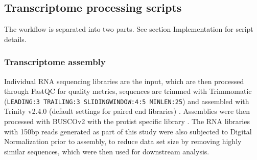 \documentclass[fleqn,10pt,lineno]{wlpeerj} %
\begin{document}
\subsection*{Transcriptome processing scripts}
The workflow is separated into two parts. 
See section Implementation for script details.
\subsubsection*{Transcriptome assembly}
Individual RNA sequencing libraries are the input, which are then processed through FastQC \citep{fastqc} for quality metrics, sequences are trimmed with Trimmomatic (\texttt{LEADING:3 TRAILING:3 SLIDINGWINDOW:4:5 MINLEN:25}) \citep{bolger2014trimmomatic} and assembled with Trinity v2.4.0 (default settings for paired end libraries) \citep{haas2013novo}. 
Assemblies were then processed with BUSCOv2 with the protist specific library \citep{simao2015busco}.
The RNA libraries with 150bp reads generated as part of this study were also subjected to Digital Normalization \citep{diginorm} prior to assembly, to reduce data set size by removing highly similar sequences, which were then used for downstream analysis.                                                                                                                                                                                                                                                                                                                                                                                                                                                                                                                                                                                                                                                                                                                                                                                                                                                                                                                                                                                                                                                                                                                                                                                                                                                                                                                                        
\end{document}
